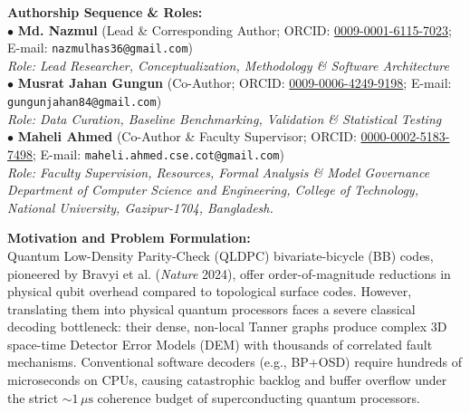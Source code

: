 \documentclass[11pt,a4paper]{article}
\begin{document}
\noindent
\textbf{Authorship Sequence \& Roles:}\\
$\bullet$ \textbf{Md. Nazmul} (Lead \& Corresponding Author; ORCID: \href{https://orcid.org/0009-0001-6115-7023}{0009-0001-6115-7023}; E-mail: \texttt{nazmulhas36@gmail.com})\\
\hspace*{0.4cm}\textit{Role: Lead Researcher, Conceptualization, Methodology \& Software Architecture}\\
$\bullet$ \textbf{Musrat Jahan Gungun} (Co-Author; ORCID: \href{https://orcid.org/0009-0006-4249-9198}{0009-0006-4249-9198}; E-mail: \texttt{gungunjahan84@gmail.com})\\
\hspace*{0.4cm}\textit{Role: Data Curation, Baseline Benchmarking, Validation \& Statistical Testing}\\
$\bullet$ \textbf{Maheli Ahmed} (Co-Author \& Faculty Supervisor; ORCID: \href{https://orcid.org/0000-0002-5183-7498}{0000-0002-5183-7498}; E-mail: \texttt{maheli.ahmed.cse.cot@gmail.com})\\
\hspace*{0.4cm}\textit{Role: Faculty Supervision, Resources, Formal Analysis \& Model Governance}\\
\textit{Department of Computer Science and Engineering, College of Technology, National University, Gazipur-1704, Bangladesh.}

\vspace{0.3cm}

\noindent
\textbf{Motivation and Problem Formulation:}\\
Quantum Low-Density Parity-Check (QLDPC) bivariate-bicycle (BB) codes, pioneered by Bravyi et al. (\textit{Nature} 2024), offer order-of-magnitude reductions in physical qubit overhead compared to topological surface codes. However, translating them into physical quantum processors faces a severe classical decoding bottleneck: their dense, non-local Tanner graphs produce complex 3D space-time Detector Error Models (DEM) with thousands of correlated fault mechanisms. Conventional software decoders (e.g., BP+OSD) require hundreds of microseconds on CPUs, causing catastrophic backlog and buffer overflow under the strict $\sim 1\,\mu\text{s}$ coherence budget of superconducting quantum processors.

\vspace{0.3cm}
\end{document}
